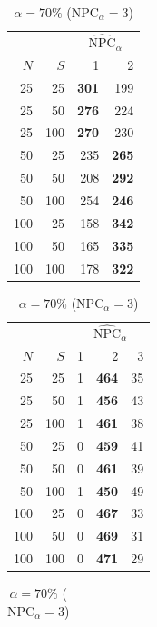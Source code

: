 \begin{table}
\begin{subtable}[h]{0.3\textwidth}
\centering
\begin{tabular}{rr|rr}
    & & \multicolumn{2}{c}{$\widehat{\text{NPC}}_{\alpha}$} \\
    $N$ & $S$ & 1 & 2 \\
    \hline
    25 & 25 & \textbf{301} & 199 \\
    25 & 50 & \textbf{276} & 224 \\
    25 & 100 & \textbf{270} & 230 \\
    50 & 25 & 235 & \textbf{265} \\
    50 & 50 & 208 & \textbf{292} \\
    50 & 100 & 254 & \textbf{246} \\
    100 & 25 & 158 & \textbf{342} \\
    100 & 50 & 165 & \textbf{335} \\
    100 & 100 & 178 & \textbf{322} \\
\end{tabular}
\caption{$\alpha = 50\%$ ($\text{NPC}_{\alpha} = 2$)}
\end{subtable}
\hfill
\begin{subtable}[h]{0.3\textwidth}
\centering
\begin{tabular}{rr|rrr}
    & & \multicolumn{3}{c}{$\widehat{\text{NPC}}_{\alpha}$} \\
    $N$ & $S$ & 1 & 2 & 3\\
    \hline
    25 & 25 & 1 & \textbf{464} & 35\\
    25 & 50 & 1 & \textbf{456} & 43\\
    25 & 100 & 1 & \textbf{461} & 38\\
    50 & 25 & 0 & \textbf{459} & 41\\
    50 & 50 & 0 & \textbf{461} & 39\\
    50 & 100 & 1 & \textbf{450} & 49\\
    100 & 25 & 0 & \textbf{467} & 33\\
    100 & 50 & 0 & \textbf{469} & 31\\
    100 & 100 & 0 & \textbf{471} & 29\\
\end{tabular}
\caption{$\alpha = 70\%$ ($\text{NPC}_{\alpha} = 3$)}
\end{subtable}
\hfill
\begin{subtable}[h]{0.3\textwidth}
\centering
\begin{tabular}{rr|rrr}

\end{tabular}
\end{subtable}
\end{table}
